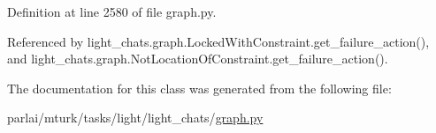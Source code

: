 Definition at line 2580 of file graph.\+py.



Referenced by light\+\_\+chats.\+graph.\+Locked\+With\+Constraint.\+get\+\_\+failure\+\_\+action(), and light\+\_\+chats.\+graph.\+Not\+Location\+Of\+Constraint.\+get\+\_\+failure\+\_\+action().



The documentation for this class was generated from the following file\+:\begin{DoxyCompactItemize}
\item 
parlai/mturk/tasks/light/light\+\_\+chats/\hyperlink{parlai_2mturk_2tasks_2light_2light__chats_2graph_8py}{graph.\+py}\end{DoxyCompactItemize}
